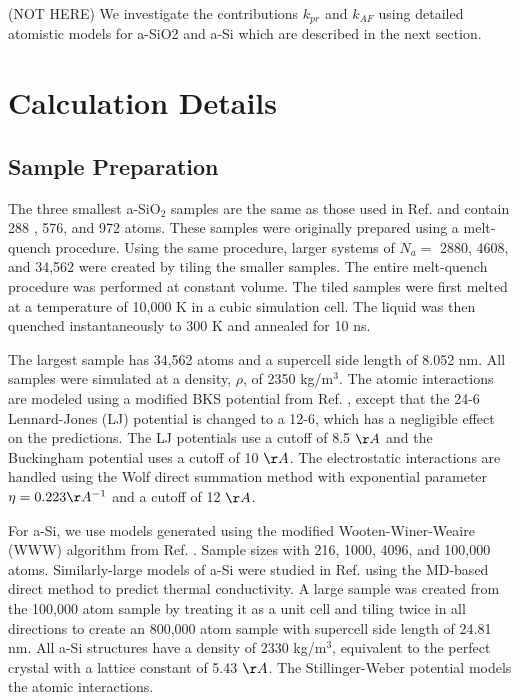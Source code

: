 \documentclass[aps,prb,onecolumn,preprint,superscriptaddress,footinbib,amsmath,amssymb,floatfix]{revtex4}
\begin{document}
(NOT HERE)
We investigate the contributions $k_{pr}$ and $k_{AF}$ using 
detailed atomistic models for a-SiO2 and a-Si which are 
described in the next section. 

\section{\label{S:Calculation}Calculation Details}

\subsection{\label{S:Sample}Sample Preparation}

The three smallest a-SiO$_2$ samples are the same as those used 
in Ref.  
and contain 288 , 576, and 972 atoms. These samples were 
originally prepared using a melt-quench procedure. 
Using the same procedure, larger systems of 
$N_a = $ 2880, 4608, and 34,562 were created by 
tiling the smaller samples.  
The entire melt-quench procedure was performed at constant volume.
\cite{mcgaughey_thermal_2004} 
The tiled samples were first 
melted at a temperature of 10,000 K in a cubic simulation cell. 
The liquid was then quenched 
instantaneously to 300 K and annealed for 10 ns. 

The largest sample 
has 34,562 atoms and a supercell side length of 8.052 nm. 
All samples were 
simulated at a density, $\rho$, of 2350 kg/m$^3$.
\cite{mcgaughey_thermal_2004} 
The atomic interactions are modeled using 
a modified BKS potential from Ref. 
, except that the 24-6 
Lennard-Jones (LJ) potential is changed to a 12-6, 
which has a negligible effect on the predictions.  
The LJ potentials use a cutoff of 8.5 $\AA$ and the Buckingham 
potential uses a cutoff of 10 $\AA$. 
The electrostatic interactions are handled using the Wolf direct 
summation method with 
exponential parameter $\eta=0.223 \AA^{-1}$ and a cutoff of 12 $\AA$.
\cite{wolf_exact_1999} 

For a-Si, we use models generated using the 
modified Wooten-Winer-Weaire (WWW) algorithm 
from Ref. .  Sample sizes 
with 216, 1000, 4096, and 100,000 atoms. 
Similarly-large 
models of a-Si were studied in Ref.  using the 
MD-based direct method to predict thermal conductivity. 
A large sample was created from the 100,000 atom sample 
by treating it 
as a unit cell and tiling twice in all directions to create an 
800,000 atom sample with supercell side length of 24.81 nm.  
All a-Si structures have a density of 2330 kg/m$^3$, 
equivalent to the perfect 
crystal with a lattice constant of 5.43 $\AA$. 
The Stillinger-Weber potential models the atomic interactions.
\cite{stillinger_computer_1985}   
\end{document}
